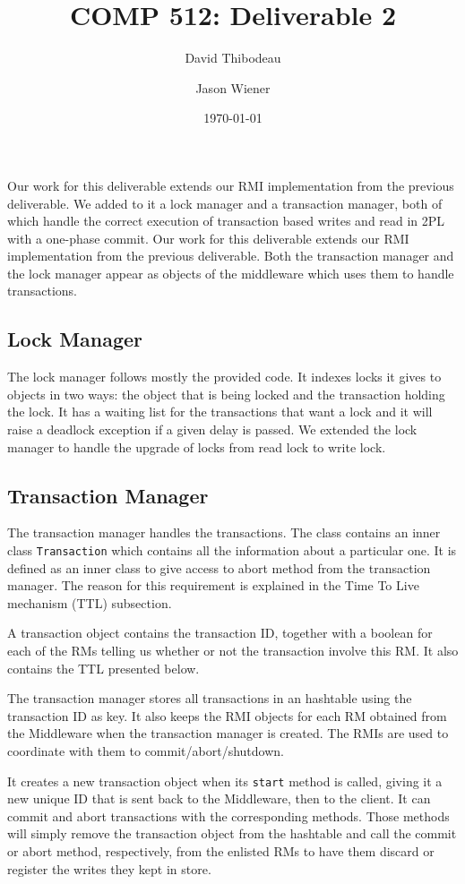 \documentclass[12pt]{article}
\author{David Thibodeau \and Jason Wiener}
\title{COMP 512: Deliverable 2}
\date{\today}
\theoremstyle{plain}%
\theoremstyle{definition}
\theoremstyle{remark}
\newcommand{\java}[1]{{\lstinline!#1!}}
\begin{document}
\maketitle

Our work for this deliverable extends our RMI implementation from the previous deliverable. We added to it a lock manager and a transaction manager, both of which handle the correct execution of transaction based writes and read in 2PL with a one-phase commit. Our work for this deliverable extends our RMI implementation from the previous deliverable. Both the transaction manager and the lock manager appear as objects of the middleware which uses them to handle transactions.

\subsection*{Lock Manager}

The lock manager follows mostly the provided code. It indexes locks it gives to objects in two ways: the object that is being locked and the transaction holding the lock. It has a waiting list for the transactions that want a lock and it will raise a deadlock exception if a given delay is passed. We extended the lock manager to handle the upgrade of locks from read lock to write lock.

\subsection*{Transaction Manager}

The transaction manager handles the transactions. The class contains an inner class \java{Transaction} which contains all the information about a particular one. It is defined as an inner class to give access to abort method from the transaction manager. The reason for this requirement is explained in the Time To Live mechanism (TTL) subsection. 

A transaction object contains the transaction ID, together with a boolean for each of the RMs telling us whether or not the transaction involve this RM. It also contains the TTL presented below.

The transaction manager stores all transactions in an hashtable using the transaction ID as key. It also keeps the RMI objects for each RM obtained from the Middleware when the transaction manager is created. The RMIs are used to coordinate with them to commit/abort/shutdown.

It creates a new transaction object when its \java{start} method is called, giving it a new unique ID that is sent back to the Middleware, then to the client. It can commit and abort transactions with the corresponding methods. Those methods will simply remove the transaction object from the hashtable and call the commit or abort method, respectively, from the enlisted RMs to have them discard or register the writes they kept in store.
\end{document}
